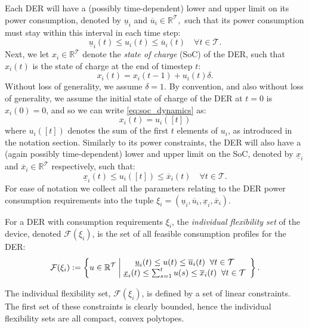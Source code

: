 Each DER will have a (possibly time-dependent) lower and upper limit on its power consumption, denoted by $\underline{u}_i$ and $\overline{u}_i \in \mathbb{R}^\mathcal{T},$ such that its power consumption must stay within this interval in each time step:
\begin{equation}
    \underline{u}_i(t) \leq u_i(t) \leq \overline{u}_i(t) \quad \forall t \in \mathcal{T}.
\end{equation}
Next, we let $x_i \in \mathbb{R}^{\mathcal{T}}$ denote the \textit{state of charge} (SoC) of the DER, such that $x_i(t)$ is the state of charge at the end of timestep $t$:
\begin{equation}\label{eq:soc_dynamics}
    x_i(t) = x_i(t-1) + u_i(t) \delta.
\end{equation}
Without loss of generality, we assume $\delta=1$. By convention, and also without loss of generality, we assume the initial state of charge of the DER at $t=0$ is $x_i(0) = 0$, and so we can write \eqref{eq:soc_dynamics} as:
\begin{equation}
    x_i(t) = u_i([t])
\end{equation}
where $u_i([t])$ denotes the sum of the first $t$ elements of $u_i$, as introduced in the notation section.
Similarly to its power constraints, the DER will also have a (again possibly time-dependent) lower and upper limit on the SoC, denoted by $\underline{x}_i$ and $\overline{x}_i \in \mathbb{R}^{\mathcal{T}}$ respectively, such that:
\begin{equation}\label{eq:energy_constraints}
    \underline{x}_i(t) \leq u_i([t]) \leq \overline{x}_i(t) \quad \forall t \in \mathcal{T}.
\end{equation}
For ease of notation we collect all the parameters relating to the DER power consumption requirements into the tuple 
$\xi_i = (\underline{u}_i, \overline{u}_i, \underline{x}_i, \overline{x}_i)$.

\begin{definition}\label{dfn:individual_flexibility_sets}
    For a DER with consumption requirements $\xi_i$, the \emph{individual flexibility set} of the device, denoted $\mathcal{F}(\xi_i)$, is the set of all feasible consumption profiles for the DER:
\begin{equation*}
    \mathcal{F}(\xi_i) := \left\{ u \in \mathbb{R}^{\mathcal{T}} \; \middle\vert \;
   \begin{array}{@{}cl}
                    \underline{u}_i(t) \leq u(t)  \leq \overline{u}_i(t) \;\; \forall t \in \mathcal{T}\\
                    \underline{x}_i(t) \leq \sum_{s=1}^t u(s) \leq \overline{x}_i(t) \;\; \forall t \in \mathcal{T}
   \end{array} 
   \right\}. 
\end{equation*}
\end{definition}
The individual flexibility set, $\mathcal{F}(\xi_i)$, is defined by a set of linear constraints.  The first set of these constraints is clearly bounded, hence the individual flexibility sets are all compact, convex polytopes.


